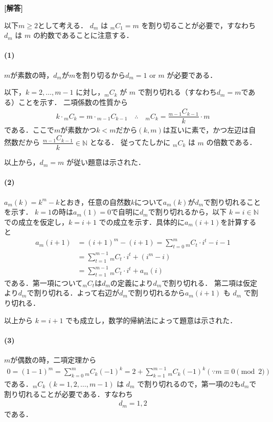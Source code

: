 \documentclass[../../main.tex]{subfiles}
\begin{document}
\begin{oframed}
  
\end{oframed}

{\bf [解答]}

以下$m \ge 2$として考える．
$d_m$ は ${}_mC_1=m$ を割り切ることが必要で，すなわち $d_m$ は $m$ の約数であることに注意する．

\paragraph{(1)}

$m$が素数の時，$d_m$が$m$を割り切るから$d_m = 1 \text{ or } m$ が必要である．

以下，$k=2,\dots,m-1$ に対し，${}_{m}C_{k}$ が $m$ で割り切れる（すなわち$d_m=m$である）ことを示す．
二項係数の性質から
\begin{align}
  k \cdot {}_{m}C_{k} = m \cdot {}_{m-1}C_{k-1}
  \quad \therefore \quad
  {}_{m}C_{k} = \dfrac{{}_{m-1}C_{k-1}}{k} \cdot m
\end{align}
である．ここで$m$が素数かつ$k<m$だから$(k,m)$は互いに素で，かつ左辺は自然数だから
$\dfrac{{}_{m-1}C_{k-1}}{k} \in \mathbb{N}$ となる．
従ってたしかに ${}_{m}C_{k}$ は $m$ の倍数である．

以上から，$d_m = m$ が従い題意は示された．

\paragraph{(2)}

$a_m(k)=k^m-k$とおき，任意の自然数$k$について$a_m(k)$が$d_m$で割り切れることを示す．
$k=1$の時は$a_m(1)=0$で自明に$d_m$で割り切れるから，以下 $k=i \in \mathbb{N}$ での成立を仮定し，$k=i+1$ での成立を示す．具体的に$a_m(i+1)$を計算すると
\begin{align}
  a_m(i+1)
  &= (i+1)^m - (i+1)
  = \sum_{t=0}^{m} {}_{m}C_{t} \cdot i^t - i - 1 \\
  &= \sum_{t=1}^{m-1} {}_{m}C_{t} \cdot i^t + (i^m - i) \\
  &= \sum_{t=1}^{m-1} {}_{m}C_{t} \cdot i^t + a_m(i)
\end{align}
である．第一項について${}_{m}C_{t}$は$d_m$の定義により$d_m$で割り切れる．
第二項は仮定より$d_m$で割り切れる．よって右辺が$d_m$で割り切れるから$a_m(i+1)$ も $d_m$ で割り切れる．

以上から $k=i+1$ でも成立し，数学的帰納法によって題意は示された．

\paragraph{(3)}

$m$が偶数の時，二項定理から
\begin{align}
  0 = (1-1)^m
  = \sum_{k=0}^{m} {}_{m}C_{k} (-1)^k
  = 2 + \sum_{k=1}^{m-1} {}_{m}C_{k} (-1)^k  (\because m \equiv 0 \pmod{2})
\end{align}
である．${}_{m}C_{k} \ (k=1,2,\dots,m-1)$ は $d_m$ で割り切れるので，第一項の$2$も$d_m$で割り切れることが必要である．すなわち
\begin{align}
  d_m = 1, 2
\end{align}
である．
\end{document}
